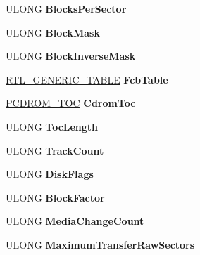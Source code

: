 \begin{DoxyCompactItemize}
\item 
\mbox{\label{struct___v_c_b_ad68b750800cabf20f1aadc2bf45e73d5}} 
U\+L\+O\+NG {\bfseries Blocks\+Per\+Sector}
\item 
\mbox{\label{struct___v_c_b_a6ec6c0ca8de8d81a29cec93af999e0e5}} 
U\+L\+O\+NG {\bfseries Block\+Mask}
\item 
\mbox{\label{struct___v_c_b_ae54af29c716602fa30eb328a0316ed7a}} 
U\+L\+O\+NG {\bfseries Block\+Inverse\+Mask}
\item 
\mbox{\label{struct___v_c_b_ae5272ebb61ae00103a94e5bf945d19ed}} 
\hyperlink{struct___r_t_l___g_e_n_e_r_i_c___t_a_b_l_e}{R\+T\+L\+\_\+\+G\+E\+N\+E\+R\+I\+C\+\_\+\+T\+A\+B\+LE} {\bfseries Fcb\+Table}
\item 
\mbox{\label{struct___v_c_b_a44470cc9a12687f347c8fcc5c35d056f}} 
\hyperlink{struct___c_d_r_o_m___t_o_c}{P\+C\+D\+R\+O\+M\+\_\+\+T\+OC} {\bfseries Cdrom\+Toc}
\item 
\mbox{\label{struct___v_c_b_aa3d1479664d331e785fc246b892f43be}} 
U\+L\+O\+NG {\bfseries Toc\+Length}
\item 
\mbox{\label{struct___v_c_b_a5efda4bc24a6b44169ef125e1408b202}} 
U\+L\+O\+NG {\bfseries Track\+Count}
\item 
\mbox{\label{struct___v_c_b_ae4b12befa1f8ec07c869127dc6f2da29}} 
U\+L\+O\+NG {\bfseries Disk\+Flags}
\item 
\mbox{\label{struct___v_c_b_aaad0079f1abf900dc80b9da1556c3909}} 
U\+L\+O\+NG {\bfseries Block\+Factor}
\item 
\mbox{\label{struct___v_c_b_aeefc8a9e209f84c5dbc43b790a1b9022}} 
U\+L\+O\+NG {\bfseries Media\+Change\+Count}
\item 
\mbox{\label{struct___v_c_b_a2099d19f89d991a522266217fa5f52c2}} 
U\+L\+O\+NG {\bfseries Maximum\+Transfer\+Raw\+Sectors}
\item 
\mbox{\label{struct___v_c_b_a4ae995f27f24b05a7e66e6eb10aea013}} 

\end{DoxyCompactItemize}
